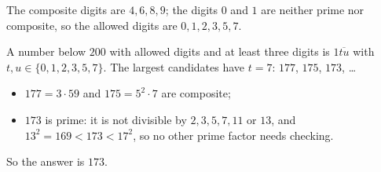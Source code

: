 The composite digits are $4,6,8,9$; the digits $0$ and $1$ are neither prime nor composite, so the allowed digits are $0,1,2,3,5,7$.

A number below $200$ with allowed digits and at least three digits is $1\overline{tu}$ with $t,u\in\{0,1,2,3,5,7\}$. The largest candidates have $t=7$: $177$, $175$, $173$, \dots
\begin{itemize}
\item $177=3\cdot59$ and $175=5^2\cdot7$ are composite;
\item $173$ is prime: it is not divisible by $2,3,5,7,11$ or $13$, and $13^2=169<173<17^2$, so no other prime factor needs checking.
\end{itemize}
So the answer is $\boxed{173}$.
